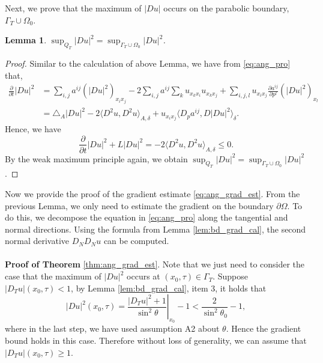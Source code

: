 \documentclass[12pt]{article}
\numberwithin{equation}{section}
\theoremstyle{plain}
\newtheorem{lemma}[theorem]{Lemma}
\theoremstyle{definition}
\theoremstyle{remark}
\begin{document}
Next, we prove that the maximum of $|Du|$ occurs on the parabolic boundary, $\Gamma_T \cup \Omega_0$. 
\begin{lemma} \label{lem:ang_Du_bd}
$\sup_{Q_T} |Du|^2=\sup_{\Gamma_T \cup \Omega_0} |Du|^2 $.
\end{lemma}  
\begin{proof}
Similar to the calculation of above Lemma, we have from \eqref{eq:ang_pro} that,
\begin{equation}
\begin{split}
\frac{\partial}{\partial t} |Du|^2 
& = \sum_{i,j} a^{ij} (|Du|^2)_{x_i x_j} - 2 \sum_{i,j} a^{ij} \sum_k u_{x_k x_i} u_{x_k x_j} + \sum_{i,j,l} u_{x_i x_j} \frac{\partial a^{ij}}{\partial p^l} (|Du|^2)_{x_l} \\
& = \triangle_A |Du|^2 - 2 \langle D^2 u,D^2 u  \rangle_{A,\delta} + u_{x_i x_j} \langle D_p a^{ij},D|Du|^2 \rangle_{\delta}.
\end{split}
\end{equation}
Hence, we have
\[
\frac{\partial}{\partial t} |Du|^2 + L|Du|^2 = -2 \langle D^2 u,D^2 u  \rangle_{A,\delta} \leq 0.
\]
By the weak maximum principle again, we obtain $ \sup_{Q_T} |Du|^2=\sup_{\Gamma_T \cup \Omega_0} |Du|^2 $. 
\end{proof} 

Now we provide the proof of the gradient estimate \eqref{eq:ang_grad_est}. 
From the previous Lemma, we
only need to estimate the gradient on the boundary $\partial\Omega$. To do this, 
we decompose the equation in \eqref{eq:ang_pro} along the tangential and normal directions. Using the formula from Lemma \ref{lem:bd_grad_cal}, the second normal derivative $D_N D_N u$ can be computed. \\ \\
\textbf{Proof of Theorem} \ref{thm:ang_grad_est}.
Note that we just need to consider the case that the maximum of $|Du|^2$ occurs at $(x_0,\tau)\in \Gamma_T$. Suppose $|D_T u| (x_0,\tau)< 1$, by Lemma \ref{lem:bd_grad_cal}, item 3, it holds that
\begin{equation}
    |Du|^2(x_0,\tau)=\left.\frac{|D_T u|^2+1}{\sin^2 \theta}\right|_{x_0}-1 < \frac{2}{\sin^2 \theta_0}-1,
\end{equation}
where in the last step, we have used assumption A2 about $\theta$.
Hence the gradient bound holds in this case. Therefore without loss of generality, 
we can assume that $|D_T u| (x_0,\tau)\geq 1$.
\end{document}
